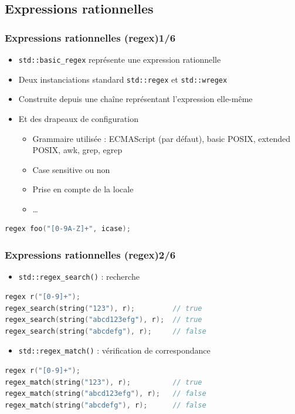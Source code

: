 \documentclass[C++.tex]{subfiles}
\begin{document}
\subsection*{Expressions rationnelles}
\begin{frame}[fragile]
	\frametitle{Expressions rationnelles (regex)\titlehfill{}1/6}
	\begin{itemize}
		\item \lstinline|std::basic_regex| représente une expression rationnelle
		\item Deux instanciations standard \lstinline|std::regex| et \lstinline|std::wregex|
		\item Construite depuis une chaîne représentant l'expression elle-même
		\item Et des drapeaux de configuration
		\begin{itemize}
			\item Grammaire utilisée : ECMAScript (par défaut), basic POSIX, extended POSIX, awk, grep, egrep
			\item Case sensitive ou non
			\item Prise en compte de la locale
			\item \ldots
		\end{itemize}
	\end{itemize}

	\begin{lstlisting}[language=C++]
regex foo("[0-9A-Z]+", icase);\end{lstlisting}
\end{frame}

\begin{frame}[fragile]
	\frametitle{Expressions rationnelles (regex)\titlehfill{}2/6}
	\begin{itemize}
		\item\lstinline|std::regex_search()| : recherche
	\end{itemize}

	\begin{lstlisting}[language=C++]
regex r("[0-9]+");
regex_search(string("123"), r);         // true
regex_search(string("abcd123efg"), r);  // true
regex_search(string("abcdefg"), r);     // false\end{lstlisting}

	\begin{itemize}
		\item \lstinline|std::regex_match()| : vérification de correspondance
	\end{itemize}

	\begin{lstlisting}[language=C++]
regex r("[0-9]+");
regex_match(string("123"), r);          // true
regex_match(string("abcd123efg"), r);   // false
regex_match(string("abcdefg"), r);      // false\end{lstlisting}
\end{frame}
\end{document}

